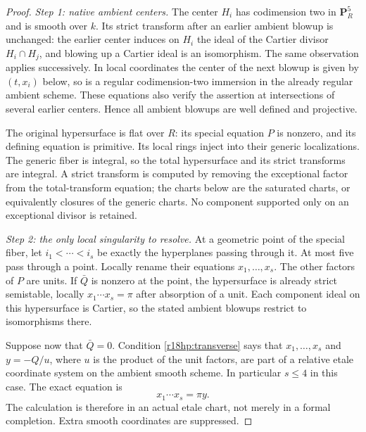 \begin{proof}
\emph{Step 1: native ambient centers.}
The center $H_i$ has codimension two in $\mathbf P^5_R$ and is
smooth over $k$.  Its strict transform after an earlier ambient
blowup is unchanged: the earlier center induces on $H_i$ the
ideal of the Cartier divisor $H_i\cap H_j$, and blowing up a
Cartier ideal is an isomorphism.  The same observation applies
successively.  In local coordinates the center of the next blowup
is given by $(t,x_i)$ below, so is a regular codimension-two
immersion in the already regular ambient scheme.  These equations
also verify the assertion at intersections of several earlier
centers.  Hence all ambient blowups are well defined and projective.

The original hypersurface is flat over $R$: its special equation
$P$ is nonzero, and its defining equation is primitive.  Its local
rings inject into their generic localizations.  The generic fiber
is integral, so the total hypersurface and its strict transforms
are integral.  A strict transform is computed by removing the
exceptional factor from the total-transform equation; the charts
below are the saturated charts, or equivalently closures of the
generic charts.  No component supported only on an exceptional
divisor is retained.

\emph{Step 2: the only local singularity to resolve.}
At a geometric point of the special fiber, let
$i_1<\cdots<i_s$ be exactly the hyperplanes passing through it.
At most five pass through a point.  Locally rename their equations
$x_1,\ldots,x_s$.  The other factors of $P$ are units.
If $\bar Q$ is nonzero at the point, the hypersurface is already
strict semistable, locally $x_1\cdots x_s=\pi$ after absorption of
a unit.  Each component ideal on this hypersurface is Cartier,
so the stated ambient blowups restrict to isomorphisms there.

Suppose now that $\bar Q=0$.  Condition
\eqref{r18hp:transverse} says that $x_1,\ldots,x_s$ and
$y=-Q/u$, where $u$ is the product of the unit factors, are part
of a relative etale coordinate system on the ambient smooth
scheme.  In particular $s\le4$ in this case.  The exact equation is
\[
                          x_1\cdots x_s=\pi y.
 \tag{HP18.7}\label{r18hp:binomial}
\]
The calculation is therefore in an actual etale chart, not merely
in a formal completion.  Extra smooth coordinates are suppressed.


\end{proof}
